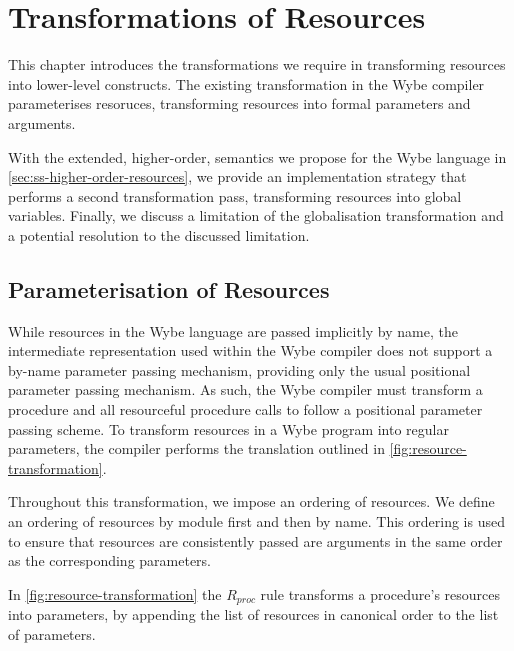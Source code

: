 \clearpage

\def\chaptertitle{Transformations of Resources}

\lhead{\emph{\chaptertitle}}

\chapter{\chaptertitle}
\label{ch:resources}

This chapter introduces the transformations we require in transforming resources into lower-level constructs. The existing transformation in the Wybe compiler parameterises resoruces, transforming resources into formal parameters and arguments.

With the extended, higher-order, semantics we propose for the Wybe language in \cref{sec:ss-higher-order-resources}, we provide an implementation strategy that performs a second transformation pass, transforming resources into global variables. Finally, we discuss a limitation of the globalisation transformation and a potential resolution to the discussed limitation.

\section{Parameterisation of Resources}
\label{sec:parameter-resource-transformation}

While resources in the Wybe language are passed implicitly by name, the intermediate representation used within the Wybe compiler does not support a by-name parameter passing mechanism, providing only the usual positional parameter passing mechanism. As such, the Wybe compiler must transform a procedure and all resourceful procedure calls to follow a positional parameter passing scheme. To transform resources in a Wybe program into regular parameters, the compiler performs the translation outlined in \cref{fig:resource-transformation}. 

Throughout this transformation, we impose an ordering of resources. We define an ordering of resources by module first and then by name. This ordering is used to ensure that resources are consistently passed are arguments in the same order as the corresponding parameters.

In \cref{fig:resource-transformation} the $R_{proc}$ rule transforms a procedure's resources into parameters, by appending the list of resources in canonical order to the list of parameters. 


